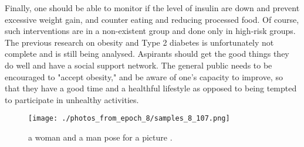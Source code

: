 \documentclass{article}%
\begin{document}
Finally, one should be able to monitor if the level of insulin are down and prevent excessive weight gain, and counter eating and reducing processed food.\newline%
Of course, such interventions are in a non{-}existent group and done only in high{-}risk groups.\newline%
The previous research on obesity and Type 2 diabetes is unfortunately not complete and is still being analysed.\newline%
Aspirants should get the good things they do well and have a social support network.\newline%
The general public needs to be encouraged to "accept obesity," and be aware of one's capacity to improve, so that they have a good time and a healthful lifestyle as opposed to being tempted to participate in unhealthy activities.\newline%

%


\begin{figure}[h!]%
\centering%
\texttt{[image: ./photos\_from\_epoch\_8/samples\_8\_107.png]}%
\caption{a woman and a man pose for a picture .}%
\end{figure}

%
\end{document}
